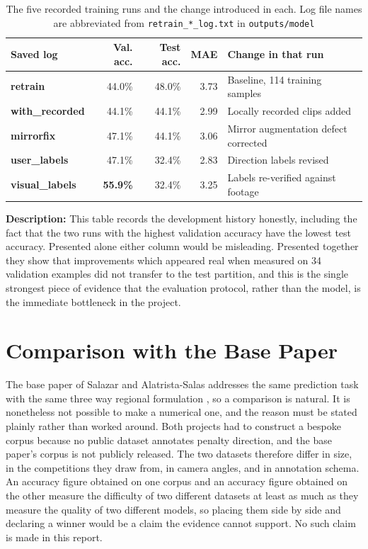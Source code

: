 \begin{table}[H]
\centering
\renewcommand{\arraystretch}{1.3}
\setlength{\tabcolsep}{4pt}
\small
\begin{tabular}{|>{\raggedright\arraybackslash\bfseries}p{3.4cm}|r|r|r|>{\raggedright\arraybackslash}p{4.0cm}|}
\hline
\textbf{Saved log} & \textbf{Val. acc.} & \textbf{Test acc.} & \textbf{MAE} & \textbf{Change in that run} \\ \hline
retrain & 44.0\% & 48.0\% & 3.73 & Baseline, 114 training samples \\ \hline
with\_recorded & 44.1\% & 44.1\% & 2.99 & Locally recorded clips added \\ \hline
mirrorfix & 47.1\% & 44.1\% & 3.06 & Mirror augmentation defect corrected \\ \hline
user\_labels & 47.1\% & 32.4\% & 2.83 & Direction labels revised \\ \hline
visual\_labels & \textbf{55.9\%} & 32.4\% & 3.25 & Labels re-verified against footage \\ \hline
\end{tabular}
\caption{The five recorded training runs and the change introduced in each. Log file names are abbreviated from \texttt{retrain\_*\_log.txt} in \texttt{outputs/model}}
\label{tab:run-history}
\end{table}
\normalsize
\setlength{\tabcolsep}{6pt}

\noindent
\textbf{Description:} This table records the development history honestly, including the fact that the two runs with the highest validation accuracy have the lowest test accuracy. Presented alone either column would be misleading. Presented together they show that improvements which appeared real when measured on 34 validation examples did not transfer to the test partition, and this is the single strongest piece of evidence that the evaluation protocol, rather than the model, is the immediate bottleneck in the project.

\section{Comparison with the Base Paper}

The base paper of Salazar and Alatrista-Salas addresses the same prediction task with the same three way regional formulation \cite{salazar2024}, so a comparison is natural. It is nonetheless not possible to make a numerical one, and the reason must be stated plainly rather than worked around. Both projects had to construct a bespoke corpus because no public dataset annotates penalty direction, and the base paper's corpus is not publicly released. The two datasets therefore differ in size, in the competitions they draw from, in camera angles, and in annotation schema. An accuracy figure obtained on one corpus and an accuracy figure obtained on the other measure the difficulty of two different datasets at least as much as they measure the quality of two different models, so placing them side by side and declaring a winner would be a claim the evidence cannot support. No such claim is made in this report.

